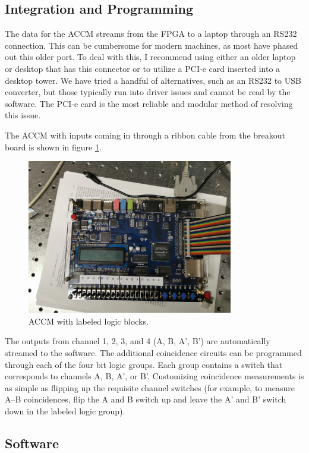 \documentclass[letterpaper, 11 pt]{article}
\begin{document}
\subsection{Integration and Programming}

The data for the ACCM streams from the FPGA to a laptop through an RS232 connection.
This can be cumbersome for modern machines, as most have phased out this older port.
To deal with this, I recommend using either an older laptop or desktop that has this
connector or to utilize a PCI-e card inserted into a desktop tower. We have tried a handful
of alternatives, such as an RS232 to USB converter, but those typically run into driver
issues and cannot be read by the software. The PCI-e card is the most reliable and modular
method of resolving this issue.

The ACCM with inputs coming in through a ribbon cable from the breakout board is shown in figure \ref{fig:accm}.
\begin{figure}[H]
    \centering
    \includegraphics[width = 9cm]{FPGA.jpg}
    \caption{ACCM with labeled logic blocks.}
    \label{fig:accm}
\end{figure}

The outputs from channel 1, 2, 3, and 4 (A, B, A', B') are automatically streamed to the software.
The additional coincidence circuits can be programmed through each of the four bit logic groups.
Each group contains a switch that corresponds to channels A, B, A', or B'. Customizing coincidence
measurements is as simple as flipping up the requisite channel switches (for example, to measure
A--B coincidences, flip the A and B switch up and leave the A' and B' switch down in the labeled logic group).

\subsection{Software}
\end{document}
